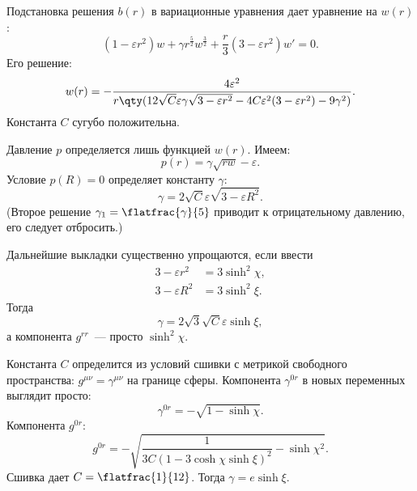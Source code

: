 \documentclass[\docroot/reports/draft/report.tex]{subfiles}
\begin{document}
    Подстановка решения $b(r)$ в вариационные уравнения дает уравнение на $w(r)$:
    \begin{equation*}
        (1 - \varepsilon r^2) w + \gamma r^\frac{5}{2} w^\frac{3}{2} + \frac{r}{3} (3 - \varepsilon r^2) w' = 0 .
    \end{equation*}
    Его решение:
    \begin{equation*}
        w(r) = - \frac{4 \varepsilon^2}{
            r \qty(
                12 \sqrt{C} \varepsilon \gamma \sqrt{3 - \varepsilon r^2} - 4 C \varepsilon^2 (3 - \varepsilon r^2) - 9 \gamma^2
            )
        } .
    \end{equation*}
    Константа $C$ сугубо положительна.

    Давление $p$ определяется лишь функцией $w(r)$. Имеем:
    \begin{equation*}
        p(r) = \gamma \sqrt{r w} - \varepsilon .
    \end{equation*}
    Условие $p(R) = 0$ определяет константу $\gamma$:
    \begin{equation*}
        \gamma = 2 \sqrt{C} \varepsilon \sqrt{3 - \varepsilon R^2} .
    \end{equation*}
    (Второе решение $\gamma_1 = \flatfrac{\gamma}{5}$ приводит к отрицательному давлению, его следует отбросить.)

    Дальнейшие выкладки существенно упрощаются, если ввести
    \begin{align*}
        3 - \varepsilon r^2 &= 3 \sinh^2\chi , \\
        3 - \varepsilon R^2 &= 3 \sinh^2\xi .
    \end{align*}
    Тогда
    \begin{equation*}
        \gamma = 2 \sqrt{3} \sqrt{C} \varepsilon \sinh\xi ,
    \end{equation*}
    а компонента $g^{rr}$~--- просто $\sinh^2\chi$.

    Константа $C$ определится из условий сшивки с метрикой свободного пространства: $g^{\mu\nu} = \gamma^{\mu\nu}$ на границе сферы. Компонента $\gamma^{0r}$ в новых переменных выглядит просто:
    \begin{equation*}
        \gamma^{0r} = - \sqrt{1 - \sinh\chi} .
    \end{equation*}
    Компонента $g^{0r}$:
    \begin{equation*}
        g^{0r} = - \sqrt{
            \frac{1}{3 C (1 - 3 \cosh\chi \sinh\xi)^2} - \sinh\chi^2
        } .
    \end{equation*}
    Сшивка дает $C = \flatfrac{1}{12}$. Тогда $\gamma = e \sinh\xi$.
\end{document}
